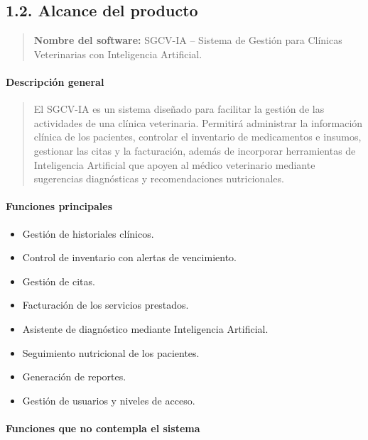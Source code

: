 \documentclass[
]{article}
\begin{document}
\subsection{1.2. Alcance del producto}\label{alcance-del-producto}

\begin{quote}
\textbf{Nombre del software:} SGCV-IA -- Sistema de Gestión para
Clínicas Veterinarias con Inteligencia Artificial.
\end{quote}

\paragraph{Descripción general}\label{descripciuxf3n-general}

\begin{quote}
El SGCV-IA es un sistema diseñado para facilitar la gestión de las
actividades de una clínica veterinaria. Permitirá administrar la
información clínica de los pacientes, controlar el inventario de
medicamentos e insumos, gestionar las citas y la facturación, además de
incorporar herramientas de Inteligencia Artificial que apoyen al médico
veterinario mediante sugerencias diagnósticas y recomendaciones
nutricionales.
\end{quote}

\paragraph{Funciones principales}\label{funciones-principales}

\begin{itemize}
\item
  Gestión de historiales clínicos.
\item
  Control de inventario con alertas de vencimiento.
\item
  Gestión de citas.
\item
  Facturación de los servicios prestados.
\item
  Asistente de diagnóstico mediante Inteligencia Artificial.
\item
  Seguimiento nutricional de los pacientes.
\item
  Generación de reportes.
\item
  Gestión de usuarios y niveles de acceso.
\end{itemize}

\paragraph{Funciones que no contempla el
sistema}\label{funciones-que-no-contempla-el-sistema}
\end{document}
